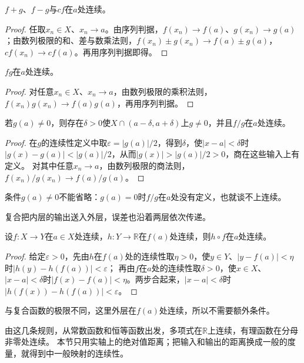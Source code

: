 \begin{theorem}[和、差与数乘的连续性]
\label{thm:ru-continuity-linear}
$f+g$、$f-g$与$cf$在$a$处连续。
\end{theorem}
\begin{proof}
任取$x_n\in X$、$x_n\to a$。由序列判据，$f(x_n)\to f(a)$、$g(x_n)\to g(a)$；由数列极限的和、差与数乘法则，$f(x_n)\pm g(x_n)\to f(a)\pm g(a)$，$cf(x_n)\to cf(a)$。再用序列判据即得。
\end{proof}

\begin{theorem}[积的连续性]
\label{thm:ru-continuity-product}
$fg$在$a$处连续。
\end{theorem}
\begin{proof}
对任意$x_n\in X$、$x_n\to a$，由数列极限的乘积法则，$f(x_n)g(x_n)\to f(a)g(a)$，再用序列判据。
\end{proof}

\begin{theorem}[商的连续性]
\label{thm:ru-continuity-quotient}
若$g(a)\neq0$，则存在$\delta>0$使$X\cap(a-\delta,a+\delta)$上$g\neq0$，并且$f/g$在$a$处连续。
\end{theorem}
\begin{proof}
在$g$的连续性定义中取$\varepsilon=|g(a)|/2$，得到$\delta$，使$|x-a|<\delta$时$|g(x)-g(a)|<|g(a)|/2$，从而$|g(x)|>|g(a)|/2>0$，商在这些输入上有定义。
对其中任意$x_n\to a$，由数列极限的商法则，$f(x_n)/g(x_n)\to f(a)/g(a)$。
\end{proof}
条件$g(a)\neq0$不能省略：$g(a)=0$时$f/g$在$a$处没有定义，也就谈不上连续。

复合把内层的输出送入外层，误差也沿着两层依次传递。
\begin{theorem}[复合函数的连续性]
\label{thm:ru-continuity-composition}
设$f:X\to Y$在$a\in X$处连续，$h:Y\to\mathbb R$在$f(a)$处连续，则$h\circ f$在$a$处连续。
\end{theorem}
\begin{proof}
给定$\varepsilon>0$，先由$h$在$f(a)$处的连续性取$\eta>0$，使$y\in Y$、$|y-f(a)|<\eta$时$|h(y)-h(f(a))|<\varepsilon$；
再由$f$在$a$处的连续性取$\delta>0$，使$x\in X$、$|x-a|<\delta$时$|f(x)-f(a)|<\eta$。两步合起来，$|x-a|<\delta$时$|h(f(x))-h(f(a))|<\varepsilon$。
\end{proof}
与复合函数的极限不同，这里外层在$f(a)$处连续，所以不需要额外条件。

由这几条规则，从常数函数和恒等函数出发，多项式在$\mathbb R$上连续，有理函数在分母非零处连续。
本节只用实轴上的绝对值距离；把输入和输出的距离换成一般的度量，就得到中一般映射的连续性。


